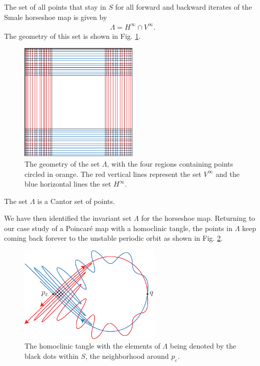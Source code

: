 \begin{definition}
	The set of all points that stay in $S$ for all forward and backward iterates of the Smale horseshoe map  is given by
	 \begin{align}
		\boxed{
\Lambda = H^{\infty } \cap V^{\infty }.
		}
	\end{align}
	The geometry of this set is shown in Fig. \ref{fig:lambda_def}.
	\begin{figure}[h!]
		\centering
		\includegraphics[width=0.5\textwidth]{figures/ch6/19lambda_def.pdf}
		\caption{The geometry of the set $\Lambda$, with the four regions containing points circled in orange. The red vertical lines represent the set $V^{\infty }$ and the blue horizontal lines the set $H^{\infty }$.}
		\label{fig:lambda_def}
	\end{figure}
\end{definition}

\begin{remark}[]
The set $\Lambda$ is a Cantor set of points.
\end{remark}

We have then identified the invariant set $\Lambda$ for the horseshoe map. Returning to our case study of a Poincaré map with a homoclinic tangle, the points in $\Lambda$ keep coming back forever to the unstable periodic orbit as shown in Fig. \ref{fig:returning_points}. 
\begin{figure}[h!]
	\centering
	\includegraphics[width=0.6\textwidth]{figures/ch6/20returning_points.pdf}
	\caption{The homoclinic tangle with the elements of $\Lambda$ being denoted by the black dots within $S$, the neighborhood around $p_\varepsilon$.}
	\label{fig:returning_points}
\end{figure}

